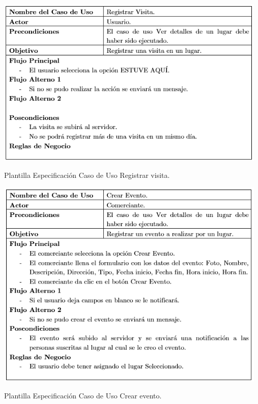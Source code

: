 \documentclass[12pt,letterpaper,openany]{book}
\begin{document}
\begin{table}[H]
\centering
\includegraphics[width=13cm]{./imagenes/PCU/registrar_visita}
\caption{Plantilla Especificación Caso de Uso Registrar visita.}
\end{table}

\begin{table}[H]
\centering
\includegraphics[width=13cm]{./imagenes/PCU/crear_evento}
\caption{Plantilla Especificación Caso de Uso Crear evento.}
\end{table}
\end{document}
